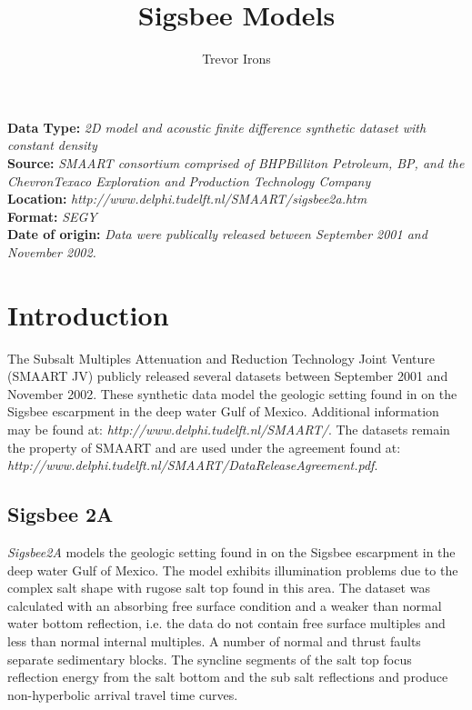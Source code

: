 \title{Sigsbee Models}
\author{Trevor Irons}
\maketitle

\lstset{language=python,numbers=left,numberstyle=\tiny,showstringspaces=false}

\noindent
\textbf	{Data Type:} \emph{2D model and acoustic finite difference synthetic dataset with constant density}\\
\textbf	{Source:} \emph{SMAART consortium comprised of BHPBilliton Petroleum, BP, and the ChevronTexaco Exploration and Production Technology Company}\\
\textbf {Location:} \emph{http://www.delphi.tudelft.nl/SMAART/sigsbee2a.htm}\\
\textbf	{Format:} \emph{SEGY} \\
\textbf{
	Date of origin:} \emph{Data were publically released between September 2001 and November 2002.}\\ 

\section{Introduction}
\noindent
The Subsalt Multiples Attenuation and Reduction Technology Joint Venture (SMAART JV) publicly released several datasets between September 2001 and November 2002.  These synthetic data model the geologic setting found in on the Sigsbee escarpment in the deep water Gulf of Mexico.  Additional information may be found at: \emph{http://www.delphi.tudelft.nl/SMAART/}.  The datasets remain the property of SMAART and are used under the agreement found at: \emph{http://www.delphi.tudelft.nl/SMAART/DataReleaseAgreement.pdf}.  

\subsection{Sigsbee 2A}
\emph{Sigsbee2A} models the geologic setting found in on the Sigsbee escarpment in the deep water Gulf of Mexico. The model exhibits illumination problems due to the complex salt shape with rugose salt top found in this area. The dataset was calculated with an absorbing free surface condition and a weaker than normal water bottom reflection, i.e. the data do not contain free surface multiples and less than normal internal multiples.  A number of normal and thrust faults separate sedimentary blocks. The syncline segments of the salt top focus reflection energy from the salt bottom and the sub salt reflections and produce non-hyperbolic arrival travel time curves.

